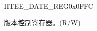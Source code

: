\begin{register}{H}{TEE\_DATE\_REG}{0x0FFC}\label{regdesc:TEEDATEREG}
%
%
\regnewline%
\begin{regdesc}\begin{reglist}
\label{fielddesc:TEEDATEREG}\item [TEE\_DATE\_REG] 版本控制寄存器。(R/W)
\end{reglist}\end{regdesc}
\end{register}
